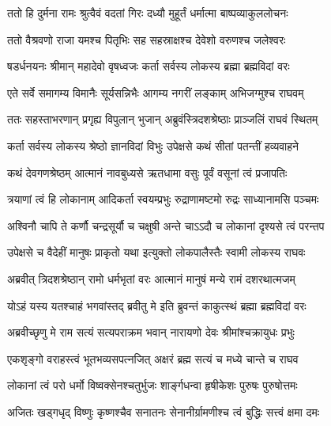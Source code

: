 

\twolineshloka
{ततो हि दुर्मना रामः श्रुत्वैवं वदतां गिरः}
{दध्यौ मुहूर्तं धर्मात्मा बाष्पव्याकुललोचनः}%


\twolineshloka
{ततो वैश्रवणो राजा यमश्च पितृभिः सह}
{सहस्राक्षश्च देवेशो वरुणश्च जलेश्वरः}%


\twolineshloka
{षडर्धनयनः श्रीमान् महादेवो वृषध्वजः}
{कर्ता सर्वस्य लोकस्य ब्रह्मा ब्रह्मविदां वरः}%


\twolineshloka
{एते सर्वे समागम्य विमानैः सूर्यसन्निभैः}
{आगम्य नगरीं लङ्काम् अभिजग्मुश्च राघवम्}%


\twolineshloka
{ततः सहस्ताभरणान् प्रगृह्य विपुलान् भुजान्}
{अब्रुवंस्त्रिदशश्रेष्ठाः प्राञ्जलिं राघवं स्थितम्}%


\twolineshloka
{कर्ता सर्वस्य लोकस्य श्रेष्ठो ज्ञानविदां विभुः}
{उपेक्षसे कथं सीतां पतन्तीं हव्यवाहने}%


\twolineshloka
{कथं देवगणश्रेष्ठम् आत्मानं नावबुध्यसे}
{ऋतधामा वसुः पूर्वं वसूनां त्वं प्रजापतिः}%


\twolineshloka
{त्रयाणां त्वं हि लोकानाम् आदिकर्ता स्वयम्प्रभुः}
{रुद्राणामष्टमो रुद्रः साध्यानामसि पञ्चमः}%


\twolineshloka
{अश्विनौ चापि ते कर्णौ चन्द्रसूर्यौ च चक्षुषी}
{अन्ते चाऽऽदौ च लोकानां दृश्यसे त्वं परन्तप}%


\twolineshloka
{उपेक्षसे च वैदेहीं मानुषः प्राकृतो यथा}
{इत्युक्तो लोकपालैस्तैः स्वामी लोकस्य राघवः}%


\twolineshloka
{अब्रवीत् त्रिदशश्रेष्ठान् रामो धर्मभृतां वरः}
{आत्मानं मानुषं मन्ये रामं दशरथात्मजम्}%


\twolineshloka
{योऽहं यस्य यतश्चाहं भगवांस्तद् ब्रवीतु मे}
{इति ब्रुवन्तं काकुत्स्थं ब्रह्मा ब्रह्मविदां वरः}%


\twolineshloka
{अब्रवीच्छृणु मे राम सत्यं सत्यपराक्रम}
{भवान् नारायणो देवः श्रीमांश्चक्रायुधः प्रभुः}%


\twolineshloka
{एकशृङ्गो वराहस्त्वं भूतभव्यसपत्नजित्}
{अक्षरं ब्रह्म सत्यं च मध्ये चान्ते च राघव}%


\twolineshloka
{लोकानां त्वं परो धर्मो विष्वक्सेनश्चतुर्भुजः}
{शार्ङ्गधन्वा हृषीकेशः पुरुषः पुरुषोत्तमः}%


\twolineshloka
{अजितः खड्गधृद् विष्णुः कृष्णश्चैव सनातनः}
{सेनानीर्ग्रामणीश्च त्वं बुद्धिः सत्त्वं क्षमा दमः}%


